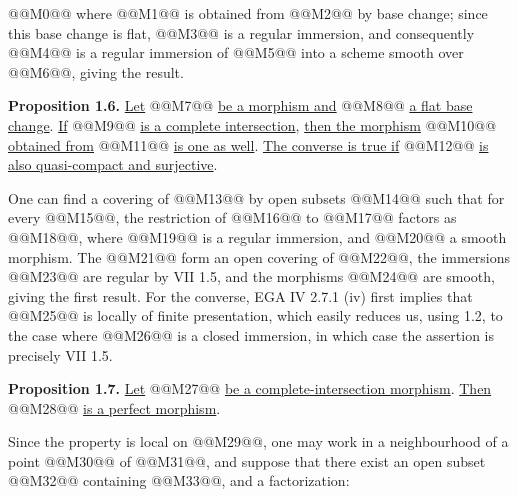 @@M0@@
where @@M1@@ is obtained from @@M2@@ by base change; since this base change is flat, @@M3@@ is a regular immersion, and consequently @@M4@@ is a regular immersion of @@M5@@ into a scheme smooth over @@M6@@, giving the result.

\textbf{Proposition 1.6.} \uline{Let} @@M7@@ \uline{be a morphism and} @@M8@@ \uline{a flat base change}. \uline{If} @@M9@@ \uline{is a complete intersection}, \uline{then the morphism} @@M10@@ \uline{obtained from} @@M11@@ \uline{is one as well}. \uline{The converse is true if} @@M12@@ \uline{is also quasi-compact and surjective}.

One can find a covering of @@M13@@ by open subsets @@M14@@ such that for every @@M15@@, the restriction of @@M16@@ to @@M17@@ factors as @@M18@@, where @@M19@@ is a regular immersion, and @@M20@@ a smooth morphism. The @@M21@@ form an open covering of @@M22@@, the immersions @@M23@@ are regular by VII 1.5, and the morphisms @@M24@@ are smooth, giving the first result. For the converse, EGA IV 2.7.1 (iv) first implies that @@M25@@ is locally of finite presentation, which easily reduces us, using 1.2, to the case where @@M26@@ is a closed immersion, in which case the assertion is precisely VII 1.5.

\textbf{Proposition 1.7.} \uline{Let} @@M27@@ \uline{be a complete-intersection morphism}. \uline{Then} @@M28@@ \uline{is a perfect morphism}.

Since the property is local on @@M29@@, one may work in a neighbourhood of a point @@M30@@ of @@M31@@, and suppose that there exist an open subset @@M32@@ containing @@M33@@, and a factorization:
